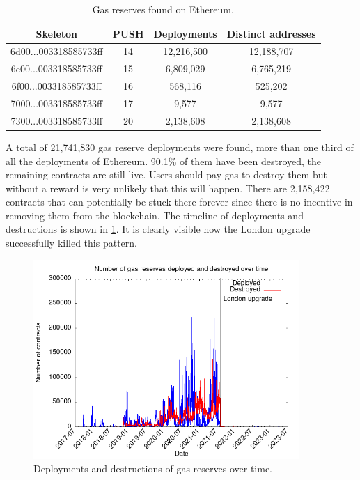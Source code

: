 \begin{table}[H]
\centering
    \begin{threeparttable}
    \begin{tabular}{ c c c c } 
    \toprule
    \textbf{Skeleton} & \textbf{PUSH} & \textbf{Deployments} & \textbf{Distinct addresses} \\
    \midrule  
    \small{6d00...003318585733ff} & 14 & 12,216,500 & 12,188,707 \\ [1.2ex]
    \small{6e00...003318585733ff} & 15 & 6,809,029 & 6,765,219 \\ [1.2ex]
    \small{6f00...003318585733ff} & 16 & 568,116 & 525,202 \\ [1.2ex]
    \small{7000...003318585733ff} & 17 & 9,577 & 9,577 \\ [1.2ex]
    \small{7300...003318585733ff} & 20 & 2,138,608 & 2,138,608 \\ [1.2ex]
    \bottomrule
    \end{tabular}
    \end{threeparttable}
    \caption{Gas reserves found on Ethereum.}
    \label{table:gas-reserve-deployments}
\end{table}

A total of 21,741,830 gas reserve deployments were found, more than one third of all the deployments of Ethereum. 90.1\% of them have been destroyed, the remaining contracts are still live. Users should pay gas to destroy them but without a reward is very unlikely that this will happen. There are 2,158,422 contracts that can potentially be stuck there forever since there is no incentive in removing them from the blockchain. The timeline of deployments and destructions is shown in \cref{fig:gastokens-timeline}. It is clearly visible how the London upgrade successfully killed this pattern.

\begin{figure}[H]
    \centering
    \includegraphics[width=0.9\textwidth]{Figures/analysis/gastokens-timeline.png}
    \caption{Deployments and destructions of gas reserves over time.}
    \label{fig:gastokens-timeline}
\end{figure}


